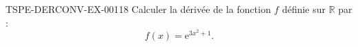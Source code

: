 \begin{exercice}{TSPE-DERCONV-EX-001}{1}{8}
Calculer la dérivée de la fonction $f$ définie sur $\mathbb{R}$ par :
\[ f(x) = \mathrm{e}^{3x^2 + 1}. \]

\end{exercice}
